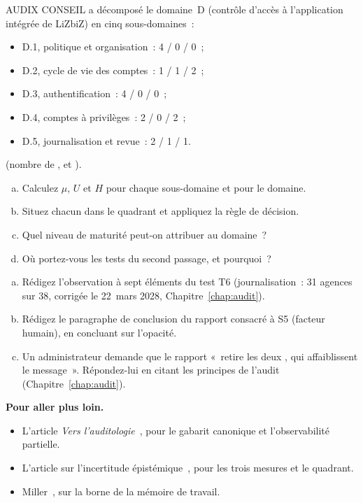 \begin{boxexo}[title={\ding{45}\quad Exercice~7.3. Le domaine D de LiZbiZ \niveaumoyen}]
AUDIX CONSEIL a décomposé le domaine~D (contrôle d'accès à l'application
intégrée de LiZbiZ) en cinq sous-domaines~:
\begin{itemize}
    \item D.1, politique et organisation~: 4 / 0 / 0~;
    \item D.2, cycle de vie des comptes~: 1 / 1 / 2~;
    \item D.3, authentification~: 4 / 0 / 0~;
    \item D.4, comptes à privilèges~: 2 / 0 / 2~;
    \item D.5, journalisation et revue~: 2 / 1 / 1.
\end{itemize}
(nombre de \OUI{}, \NON{} et \NEK{}).
\begin{enumerate}[(a)]
    \item Calculez $\mu$, $U$ et $H$ pour chaque sous-domaine et pour le
          domaine.
    \item Situez chacun dans le quadrant et appliquez la règle de décision.
    \item Quel niveau de maturité peut-on attribuer au domaine~?
    \item Où portez-vous les tests du second passage, et pourquoi~?
\end{enumerate}
\end{boxexo}

\begin{boxexo}[title={\ding{45}\quad Exercice~7.4. Observation et conclusion \niveauexpert}]
\begin{enumerate}[(a)]
    \item Rédigez l'observation à sept éléments du test T6 (journalisation~:
          31 agences sur 38, corrigée le 22~mars 2028, Chapitre~\ref{chap:audit}).
    \item Rédigez le paragraphe de conclusion du rapport consacré à S5
          (facteur humain), en concluant sur l'opacité.
    \item Un administrateur demande que le rapport «~retire les deux
          \NEK{}, qui affaiblissent le message~». Répondez-lui en citant
          les principes de l'audit (Chapitre~\ref{chap:audit}).
\end{enumerate}
\end{boxexo}

\bigskip

\begin{boxinfo}
\textbf{Pour aller plus loin.}
\begin{itemize}
    \item L'article \emph{Vers l'auditologie}~\cite{minka2026auditologie},
          pour le gabarit canonique et l'observabilité partielle.
    \item L'article sur l'incertitude épistémique~\cite{minka2026nek}, pour
          les trois mesures et le quadrant.
    \item Miller~\cite{miller1956}, sur la borne de la mémoire de travail.
\end{itemize}
\end{boxinfo}

